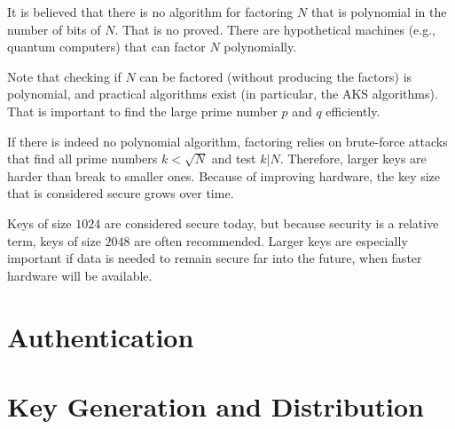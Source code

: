 It is believed that there is no algorithm for factoring $N$ that is polynomial in the number of bits of $N$.
That is no proved.
There are hypothetical machines (e.g., quantum computers) that can factor $N$ polynomially.

Note that checking if $N$ can be factored (without producing the factors) is polynomial, and practical algorithms exist (in particular, the AKS algorithms).
That is important to find the large prime number $p$ and $q$ efficiently.
\medskip

If there is indeed no polynomial algorithm, factoring relies on brute-force attacks that find all prime numbers $k<\sqrt{N}$ and test $k|N$.
Therefore, larger keys are harder than break to smaller ones.
Because of improving hardware, the key size that is considered secure grows over time.

Keys of size $1024$ are considered secure today, but because security is a relative term, keys of size $2048$ are often recommended. 
Larger keys are especially important if data is needed to remain secure far into the future, when faster hardware will be available.

\section{Authentication}

\section{Key Generation and Distribution}

